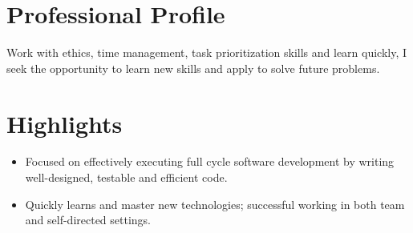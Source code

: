 \documentclass[letterpaper]{twentysecondcv} %
\begin{document}





\makeprofile %


\section{Professional Profile}

Work with ethics, time management, task prioritization skills and learn quickly, I seek the opportunity to learn new skills and apply to solve future problems.

\section{Highlights}
\begin{itemize}
	\item Focused on effectively executing full cycle software development by writing well-designed, testable and efficient code.
	\item Quickly learns and master new technologies; successful working in both team and self-directed settings.
\end{itemize}

\end{document}
